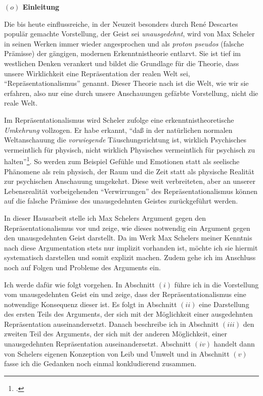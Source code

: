 \documentclass[a4paper, 12pt]{article}
\begin{document}
\begin{onehalfspace} 

\noindent\textbf{$(o)$ Einleitung}

\noindent Die bis heute einflussreiche, in der Neuzeit besonders durch Ren\'e Descartes populär gemachte Vorstellung, der Geist sei \emph{unausgedehnt}, wird von Max Scheler in seinen Werken immer wieder angesprochen und als \emph{proton pseudos} (falsche Prämisse) der gängigen, modernen Erkenntnistheorie entlarvt. Sie ist tief im westlichen Denken verankert und bildet die Grundlage für die Theorie, dass unsere Wirklichkeit eine Repräsentation der realen Welt sei, "`Repräsentationalismus"' genannt. Dieser Theorie nach ist die Welt, wie wir sie erfahren, also nur eine durch unsere Anschauungen gefärbte Vorstellung, nicht die reale Welt.

Im Repräsentationalismus wird Scheler zufolge eine erkenntnistheoretische \emph{Umkehrung} vollzogen. Er habe erkannt, "`daß in der natürlichen normalen Weltanschauung die \emph{vorwiegende} Täuschungsrichtung ist, wirklich Psychisches vermeintlich für physisch, nicht wirklich Physisches vermeintlich für psychisch zu halten"'\footnote{\Cite[Siehe][S. 257]{scheler-idole}.}. So werden zum Beispiel Gefühle und Emotionen statt als seelische Phänomene als rein physisch, der Raum und die Zeit statt als physische Realität zur psychischen Anschauung umgekehrt. Diese weit verbreiteten, aber an unserer Lebensrealität vorbeigehenden "`Verwirrungen"' des Repräsentationalismus können auf die falsche Prämisse des unausgedehnten Geistes zurückgeführt werden. 

In dieser Hausarbeit stelle ich Max Schelers Argument gegen den Repräsentationalismus vor und zeige, wie dieses notwendig ein Argument gegen den unausgedehnten Geist darstellt. Da im Werk Max Schelers meiner Kenntnis nach diese Argumentation stets nur implizit vorhanden ist, möchte ich sie hiermit systematisch darstellen und somit explizit machen. Zudem gehe ich im Anschluss noch auf Folgen und Probleme des Arguments ein. 

\vspace{3mm}

Ich werde dafür wie folgt vorgehen. In Abschnitt $(i)$ führe ich in die Vorstellung vom unausgedehnten Geist ein und zeige, dass der Repräsentationalismus eine notwendige Konsequenz dieser ist. Es folgt in Abschnitt $(ii)$ eine Darstellung des ersten Teils des Arguments, der sich mit der Möglichkeit einer ausgedehnten Repräsentation auseinandersetzt. Danach beschreibe ich in Abschnitt $(iii)$ den zweiten Teil des Arguments, der sich mit der anderen Möglichkeit, einer unausgedehnten Repräsentation auseinandersetzt. Abschnitt $(iv)$ handelt dann von Schelers eigenen Konzeption von Leib und Umwelt und in Abschnitt $(v)$ fasse ich die Gedanken noch einmal konkludierend zusammen.


\end{onehalfspace}
\end{document}
